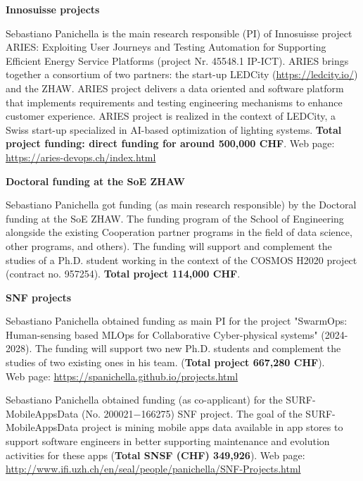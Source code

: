 \documentclass[11pt]{article}
\newcommand{\ra}{$\rightarrow$}
\newcommand{\chg}[2]{\textcolor{red}{\sout{#1}}{\ra}\textcolor{blue}{\uline{#2}}} %
\newcommand{\chg}[2]{#2}
\begin{document}
\medskip 
\textbf{Innosuisse projects}
\begin{innerlist}
   \item Sebastiano Panichella is the main research responsible (PI) of Innosuisse project ARIES: Exploiting User Journeys and Testing Automation for Supporting Efficient Energy Service Platforms (project Nr. 45548.1 IP-ICT).
ARIES brings together a consortium of two partners: the start-up LEDCity (\href{https://ledcity.io/}{https://ledcity.io/}) and the ZHAW. 
ARIES project delivers a data oriented and software platform that implements requirements and testing engineering mechanisms to enhance customer experience. ARIES project is realized in the context of LEDCity, a Swiss start-up specialized in AI-based optimization of lighting systems.
\textbf{Total project funding: direct funding for around \textbf{500,000 CHF}}. Web page: \href{https://aries-devops.ch/index.html}{https://aries-devops.ch/index.html}
\end{innerlist}
\medskip 
\textbf{Doctoral funding at the SoE ZHAW}
\begin{innerlist}
   \item Sebastiano Panichella got funding (as main research responsible) by the Doctoral funding at the SoE ZHAW.
The funding program of the School of Engineering alongside the existing Cooperation partner programs in the field of data science, other programs, and others).
The funding will support and complement the studies of a Ph.D. student working in the context of the COSMOS H2020 project (contract no. 957254).
\textbf{Total project 114,000 CHF}. 
\end{innerlist}
\medskip
\textbf{SNF projects}
\begin{innerlist}
   \item Sebastiano Panichella obtained funding as main PI for
   the project "SwarmOps: Human-sensing based MLOps for Collaborative Cyber-physical systems" (2024-2028). The funding will support two new Ph.D. students and complement the studies of two existing ones in his team. (\textbf{Total project 667,280 CHF}). \\Web page: \href{https://spanichella.github.io/projects.html}{https://spanichella.github.io/projects.html}
   \item Sebastiano Panichella obtained funding  (as co-applicant) for
   the SURF-MobileAppsData  (No. 200021$-$166275) SNF project. The goal of the SURF-MobileAppsData project is mining mobile apps data available in app stores to support software engineers in better supporting maintenance and evolution activities for these apps (\textbf{Total SNSF (CHF) 349,926}). Web page: \href{http://www.ifi.uzh.ch/en/seal/people/panichella/SNF-Projects.html}{http://www.ifi.uzh.ch/en/seal/people/panichella/SNF-Projects.html}
\end{innerlist}
\end{document}
